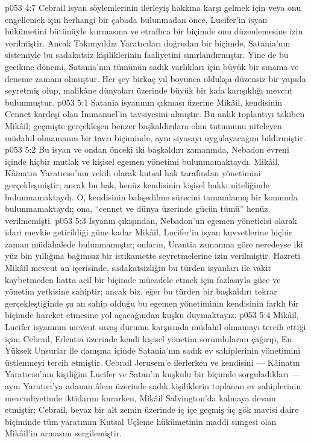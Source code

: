\vs p053 4:7 Cebrail isyan söylemlerinin ilerleyiş hakkına karşı gelmek için veya onu engellemek için herhangi bir çabada bulunmadan önce, Lucifer’in isyan hükümetini bütünüyle kurmasına ve etraflıca bir biçimde onu düzenlemesine izin verilmiştir. Ancak Takımyıldız Yaratıcıları doğrudan bir biçimde, Satania’nın sistemiyle bu sadakatsiz kişiliklerinin faaliyetini sınırlandırmıştır. Yine de bu gecikme dönemi, Satania’nın tümünün sadık varlıkları için büyük bir sınama ve deneme zamanı olmuştur. Her şey birkaç yıl boyunca oldukça düzensiz bir yapıda seyretmiş olup, malikâne dünyaları üzerinde büyük bir kafa karışıklığı mevcut bulunmuştur.
\vs p053 5:1 Satania isyanının çıkması üzerine Mikâil, kendisinin Cennet kardeşi olan Immanuel’in tavsiyesini almıştır. Bu anlık toplantıyı takiben Mikâil; geçmişte gerçekleşen benzer başkaldırılara olan tutumunu niteleyen müdahil olmamanın bir tavrı biçiminde, aynı siyasayı uygulayacağını bildirmiştir.
\vs p053 5:2 Bu isyan ve ondan önceki iki başkaldırı zamanında, Nebadon evreni içinde hiçbir mutlak ve kişisel egemen yönetimi bulunmamaktaydı. Mikâil, Kâinatın Yaratıcısı’nın vekili olarak kutsal hak tarafından yönetimini gerçekleşmiştir; ancak bu hak, henüz kendisinin kişisel hakkı niteliğinde bulunmamaktaydı. O, kendisinin bahşedilme sürecini tamamlamış bir konumda bulunmamaktaydı; ona, “cennet ve dünya üzerinde gücün tümü” henüz verilmemişti.
\vs p053 5:3 İsyanın çıkışından, Nebadon’un egemen yöneticisi olarak idari mevkie getirildiği güne kadar Mikâil, Lucifer’in isyan kuvvetlerine hiçbir zaman müdahalede bulunmamıştır; onların, Urantia zamanına göre neredeyse iki yüz bin yıllığına bağımsız bir istikamette seyretmelerine izin verilmiştir. Hazreti Mikâil mevcut an içerisinde, sadakatsizliğin bu türden isyanları ile vakit kaybetmeden hatta acil bir biçimde mücadele etmek için fazlasıyla güce ve yönetim yetkisine sahiptir; ancak biz, eğer bu türden bir başkaldırı tekrar gerçekleştiğinde şu an sahip olduğu bu egemen yönetiminin kendisinin farklı bir biçimde hareket etmesine yol açacağından kuşku duymaktayız.
\vs p053 5:4 Mikâil, Lucifer isyanının mevcut savaş durumu karşısında müdahil olmamayı tercih ettiği için; Cebrail, Edentia üzerinde kendi kişisel yönetim sorumlularını çağırıp, En Yüksek Unsurlar ile danışma içinde Satania’nın sadık ev sahiplerinin yönetimini üstlenmeyi tercih etmiştir. Cebrail Jerusem’e ilerlerken ve kendisini --- Kâinatın Yaratıcısı’nın kişiliğini Lucifer ve Satan’ın kuşkulu bir biçimde sorguladıkları --- aynı Yaratıcı’ya adanan âlem üzerinde sadık kişiliklerin toplanan ev sahiplerinin mevcudiyetinde iktidarını kurarken, Mikâil Salvington’da kalmaya devam etmiştir; Cebrail, beyaz bir alt zemin üzerinde iç içe geçmiş üç gök mavisi daire biçiminde tüm yaratımın Kutsal Üçleme hükümetinin maddi simgesi olan Mikâil’in armasını sergilemiştir.
